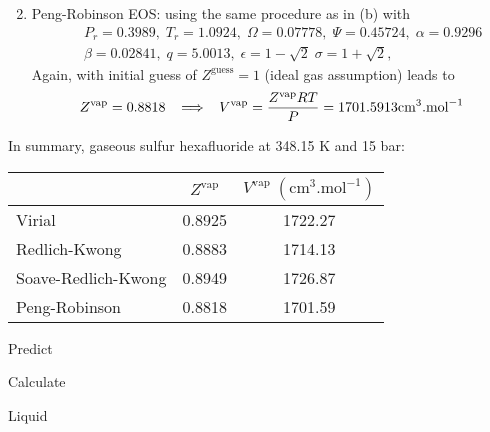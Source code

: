 \begin{probsol}
\begin{enumerate}[1.]
\begin{displaymath}
                   \end{displaymath}
%
        \item Peng-Robinson EOS: using the same procedure as in (b) with 
                   \begin{eqnarray}
                      && P_{r} = 0.3989,\; T_{r}=1.0924,\; \Omega=0.07778,\; \Psi = 0.45724,\; \alpha=0.9296 \nonumber  \\
                      && \beta = 0.02841,\; q=5.0013,\; \epsilon = 1 - \sqrt{2}\; \sigma = 1 + \sqrt{2}, \nonumber 
                   \end{eqnarray}
                   Again, with initial guess of $Z^{\text{guess}}=1$ (ideal gas assumption) leads to 
                   \begin{displaymath}
                      Z^{\text{vap}} = 0.8818 \;\;\;\Longrightarrow \;\;\; V^{\text{vap}} = \displaystyle\frac{Z^{\text{vap}} R T}{P} = 1701.5913 \text{cm}^{3}\text{.mol}^{-1}
                   \end{displaymath}
%
     \end{enumerate}
     In summary, gaseous sulfur hexafluoride at 348.15 K and 15 bar:
     \begin{center}
        \begin{tabular} {l| c c }
           \hline
                               &  $Z^{\text{vap}}$    & $V^{\text{vap}}\;\left(\text{cm}^{3}\text{.mol}^{-1}\right)$    \\
           \hline
           Virial              &  0.8925           & 1722.27                                                    \\
           Redlich-Kwong       &  0.8883           & 1714.13                                                    \\
           Soave-Redlich-Kwong &  0.8949           & 1726.87                                                    \\
           Peng-Robinson       &  0.8818           & 1701.59
   
        \end{tabular}
     \end{center}


  \end{probsol}
%
  \begin{probsol}\label{Chapter:VolumetricPropertiesPureSubstances:Problem:02:solution}
     Predict 
  \end{probsol}
%
  \begin{probsol}\label{Chapter:VolumetricPropertiesPureSubstances:Problem:03:solution}
     Calculate
  \end{probsol}
%
  \begin{probsol}\label{Chapter:VolumetricPropertiesPureSubstances:Problem:04:solution} 
     Liquid 
  \end{probsol}
%
